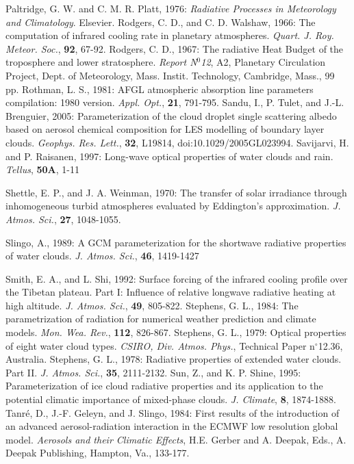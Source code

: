 \decrefname
Paltridge, G. W. and C. M. R. Platt, 1976:
      {\it Radiative Processes in Meteorology and Climatology}.
      Elsevier.
\decrefname
Rodgers, C. D., and C. D. Walshaw, 1966:
      The computation of infrared cooling rate in planetary atmospheres.
      {\it Quart. J. Roy. Meteor. Soc.},
      {\bf 92},
      67-92.
\decrefname
Rodgers, C. D., 1967:
      The radiative Heat Budget of the troposphere and lower stratosphere.
      {\it Report N$^0$12},
      A2, Planetary Circulation Project, Dept. of Meteorology, Mass. Instit.
      Technology, Cambridge, Mass.,
      99 pp.
\decrefname
Rothman, L. S., 1981:
      AFGL atmospheric absorption line parameters compilation: 1980 version.
      {\it Appl. Opt.},
      {\bf 21},
      791-795.
\decrefname
Sandu, I., P. Tulet, and J.-L. Brenguier, 2005:
      Parameterization of the cloud droplet single scattering albedo based on
      aerosol chemical composition for LES modelling of boundary layer clouds.
      {\it Geophys. Res. Lett.},  {\bf 32}, L19814, doi:10.1029/2005GL023994.
\decrefname
Savijarvi, H. and P. Raisanen, 1997: Long-wave optical properties of water clouds and rain. 
{\it Tellus},
{\bf 50A},
1-11

\decrefname
Shettle, E. P., and J. A. Weinman, 1970:
      The transfer of solar irradiance through inhomogeneous turbid atmospheres
      evaluated by Eddington's approximation.
      {\it J. Atmos. Sci.},
      {\bf 27},
      1048-1055.

\decrefname
Slingo, A., 1989: A GCM parameterization for the shortwave radiative properties of water clouds. 
{\it J. Atmos. Sci.},
{\bf 46},
1419-1427

\decrefname
Smith, E. A., and L. Shi, 1992:
      Surface forcing of the infrared cooling profile over the Tibetan plateau.
      Part I: Influence of relative longwave radiative heating at high altitude.
      {\it J. Atmos. Sci.},
      {\bf 49},
      805-822.
\decrefname
Stephens, G. L., 1984:
      The parametrization of radiation for numerical weather prediction and
      climate models.
      {\it Mon. Wea. Rev.},
      {\bf 112},
      826-867.
\decrefname
Stephens, G. L., 1979:
      Optical properties of eight water cloud types.
      {\it CSIRO, Div. Atmos. Phys.},
      Technical Paper n$^\circ$12.36,
      Australia.
\decrefname
Stephens, G. L., 1978:
      Radiative properties of extended water clouds. Part II.
      {\it J. Atmos. Sci.},
      {\bf 35},
      2111-2132.
\decrefname
Sun, Z., and K. P. Shine, 1995:
      Parameterization of ice cloud radiative properties and its application to
      the potential climatic importance of mixed-phase clouds.
      {\it J. Climate},
      {\bf 8},
      1874-1888.
\decrefname
Tanr\'e, D., J.-F. Geleyn, and J. Slingo, 1984:
      First results of the introduction of an advanced aerosol-radiation
      interaction in the ECMWF low resolution global model.
      {\it Aerosols and their Climatic Effects},
      H.E. Gerber and A. Deepak, Eds., A. Deepak Publishing, Hampton, Va.,
      133-177.

